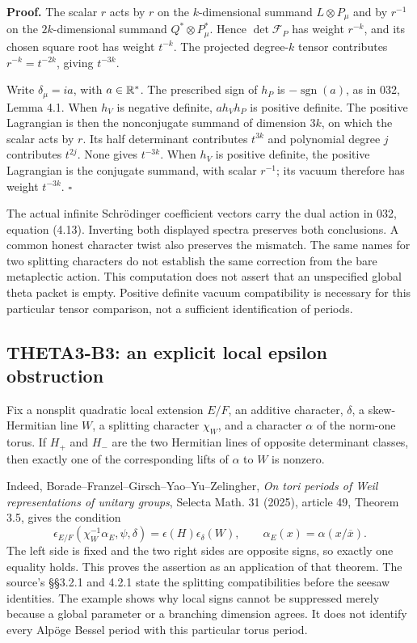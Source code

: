 \documentclass[11pt]{article}
\theoremstyle{definition}\newtheorem{definition}[theorem]{Definition}\newtheorem{remark}[theorem]{Remark}
\begin{document}
\textbf{Proof.} The scalar $r$ acts by $r$ on the $k$-dimensional summand $L\otimes P_\mu$ and by $r^{-1}$ on the $2k$-dimensional summand $Q^*\otimes P_\mu^*$. Hence $\det\mathcal F_P$ has weight $r^{-k}$, and its chosen square root has weight $t^{-k}$. The projected degree-$k$ tensor contributes $r^{-k}=t^{-2k}$, giving $t^{-3k}$.

Write $\delta_\mu=ia$, with $a\in\mathbb R^*$. The prescribed sign of $h_P$ is $-\operatorname{sgn}(a)$, as in 032, Lemma 4.1. When $h_V$ is negative definite, $a h_Vh_P$ is positive definite. The positive Lagrangian is then the nonconjugate summand of dimension $3k$, on which the scalar acts by $r$. Its half determinant contributes $t^{3k}$ and polynomial degree $j$ contributes $t^{2j}$. None gives $t^{-3k}$. When $h_V$ is positive definite, the positive Lagrangian is the conjugate summand, with scalar $r^{-1}$; its vacuum therefore has weight $t^{-3k}$. \hfill$\square$

The actual infinite Schr\"odinger coefficient vectors carry the dual action in 032, equation (4.13). Inverting both displayed spectra preserves both conclusions. A common honest character twist also preserves the mismatch. The same names for two splitting characters do not establish the same correction from the bare metaplectic action. This computation does not assert that an unspecified global theta packet is empty. Positive definite vacuum compatibility is necessary for this particular tensor comparison, not a sufficient identification of periods.

\subsection{THETA3-B3: an explicit local epsilon obstruction}\label{B3}

Fix a nonsplit quadratic local extension $E/F$, an additive character, $\delta$, a skew-Hermitian line $W$, a splitting character $\chi_W$, and a character $\alpha$ of the norm-one torus. If $H_+$ and $H_-$ are the two Hermitian lines of opposite determinant classes, then exactly one of the corresponding lifts of $\alpha$ to $W$ is nonzero.

Indeed, Borade--Franzel--Girsch--Yao--Yu--Zelingher, \emph{On tori periods of Weil representations of unitary groups}, Selecta Math. 31 (2025), article 49, Theorem 3.5, gives the condition
\[
 \epsilon_{E/F}(\chi_W^{-1}\alpha_E,\psi,\delta)
       =\epsilon(H)\epsilon_\delta(W),
 \qquad \alpha_E(x)=\alpha(x/\overline x).
\]
The left side is fixed and the two right sides are opposite signs, so exactly one equality holds. This proves the assertion as an application of that theorem. The source's \S\S3.2.1 and 4.2.1 state the splitting compatibilities before the seesaw identities. The example shows why local signs cannot be suppressed merely because a global parameter or a branching dimension agrees. It does not identify every Alp\"oge Bessel period with this particular torus period.
\end{document}

